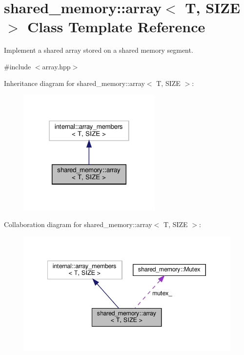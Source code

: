 \hypertarget{classshared__memory_1_1array}{}\section{shared\+\_\+memory\+:\+:array$<$ T, S\+I\+ZE $>$ Class Template Reference}
\label{classshared__memory_1_1array}


Implement a shared array stored on a shared memory segment.  




{\ttfamily \#include $<$array.\+hpp$>$}



Inheritance diagram for shared\+\_\+memory\+:\+:array$<$ T, S\+I\+ZE $>$\+:
\nopagebreak
\begin{figure}[H]
\begin{center}
\leavevmode
\includegraphics[width=202pt]{classshared__memory_1_1array__inherit__graph}
\end{center}
\end{figure}


Collaboration diagram for shared\+\_\+memory\+:\+:array$<$ T, S\+I\+ZE $>$\+:
\nopagebreak
\begin{figure}[H]
\begin{center}
\leavevmode
\includegraphics[width=340pt]{classshared__memory_1_1array__coll__graph}
\end{center}
\end{figure}
